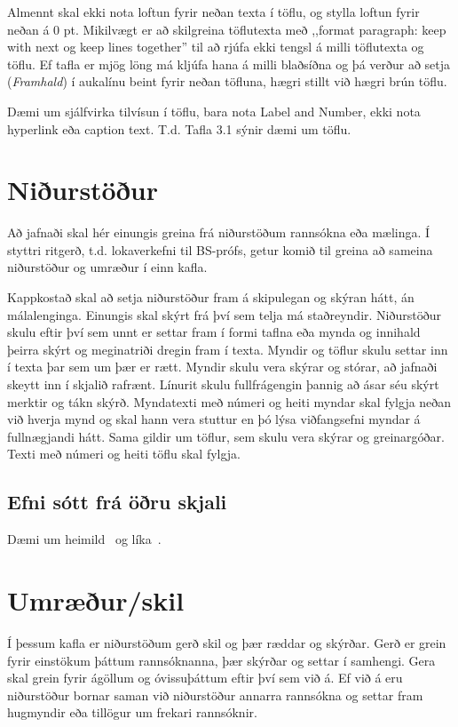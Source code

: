 \documentclass[a4paper, 12pt, twoside]{scrreprt}
\begin{document}
Almennt skal ekki nota loftun fyrir neðan texta í töflu, og stylla loftun fyrir neðan á 0 pt.
Mikilvægt er að skilgreina töflutexta með ,,format paragraph: keep with next og keep lines together” til að rjúfa ekki tengsl á milli töflutexta og töflu. Ef tafla er mjög löng má kljúfa hana á milli blaðsíðna og þá verður að setja (\textit{Framhald}) í aukalínu beint fyrir neðan töfluna, hægri stillt við hægri brún töflu.

Dæmi um sjálfvirka tilvísun í töflu, bara nota Label and Number, ekki nota hyperlink eða caption text. T.d. Tafla 3.1 sýnir dæmi um töflu.

\chapter{Niðurstöður}
Að jafnaði skal hér einungis greina frá niðurstöðum rannsókna eða mælinga. Í styttri ritgerð, t.d. lokaverkefni til BS-prófs, getur komið til greina að sameina niðurstöður og umræður í einn kafla.

Kappkostað skal að setja niðurstöður fram á skipulegan og skýran hátt, án málalenginga. Einungis skal skýrt frá því sem telja má staðreyndir. Niðurstöður skulu eftir því sem unnt er settar fram í formi taflna eða mynda og innihald þeirra skýrt og meginatriði dregin fram í texta. Myndir og töflur skulu settar inn í texta þar sem um þær er rætt. Myndir skulu vera skýrar og stórar, að jafnaði skeytt inn í skjalið rafrænt. Línurit skulu fullfrágengin þannig að ásar séu skýrt merktir og tákn skýrð. Myndatexti með númeri og heiti myndar skal fylgja neðan við hverja mynd og skal hann vera stuttur en þó lýsa viðfangsefni myndar á fullnægjandi hátt. Sama gildir um töflur, sem skulu vera skýrar og greinargóðar. Texti með númeri og heiti töflu skal fylgja.

\section{Efni sótt frá öðru skjali}
Dæmi um heimild~\cite{dirac} og líka~\cite{einstein}.


\chapter{Umræður/skil}
Í þessum kafla er niðurstöðum gerð skil og þær ræddar og skýrðar. Gerð er grein fyrir einstökum þáttum rannsóknanna, þær skýrðar og settar í samhengi. Gera skal grein fyrir ágöllum og óvissuþáttum eftir því sem við á. Ef við á eru niðurstöður bornar saman við niðurstöður annarra rannsókna og settar fram hugmyndir eða tillögur um frekari rannsóknir.
\end{document}
